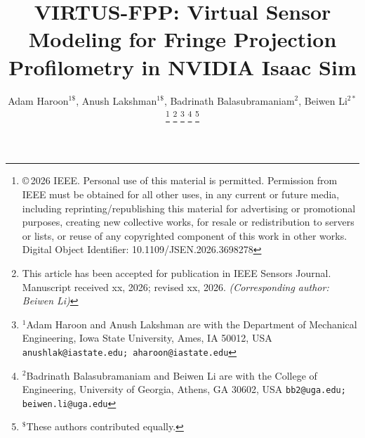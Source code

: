 \documentclass[journal,twoside,web]{ieeecolor}
\begin{document}
\title{VIRTUS-FPP: Virtual Sensor Modeling for Fringe Projection Profilometry in NVIDIA Isaac Sim}

\author{Adam Haroon$^{1\$}$, Anush Lakshman$^{1\$}$, Badrinath Balasubramaniam$^{2}$, Beiwen Li$^{2*}$
\thanks{\copyright\,2026 IEEE. Personal use of this material is permitted. Permission from IEEE must be obtained for all other uses, in any current or future media, including reprinting/republishing this material for advertising or promotional purposes, creating new collective works, for resale or redistribution to servers or lists, or reuse of any copyrighted component of this work in other works. Digital Object Identifier: 10.1109/JSEN.2026.3698278}
\thanks{This article has been accepted for publication in IEEE Sensors Journal. Manuscript received xx, 2026; revised xx, 2026. \textit{(Corresponding author: Beiwen Li)}}
\thanks{$^{1}$Adam Haroon and Anush Lakshman are with the Department of
        Mechanical Engineering, Iowa State University, Ames, IA 50012, USA
        {\tt\small anushlak@iastate.edu; aharoon@iastate.edu}}%
\thanks{$^{2}$Badrinath Balasubramaniam and Beiwen Li are with the College of Engineering,
        University of Georgia, Athens, GA 30602, USA
        {\tt\small bb2@uga.edu; beiwen.li@uga.edu}}%
\thanks{$^{\$}$These authors contributed equally.}
}
\end{document}
